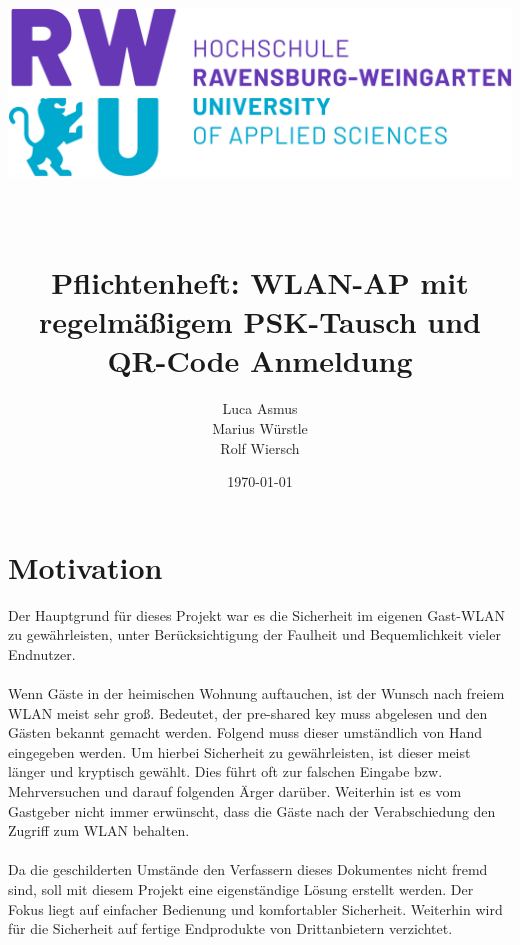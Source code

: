 \documentclass[a4paper,11pt,singlespacing]{article}
\begin{document}
	\setlength{\parindent}{0ex}
	
	\begin{titlepage}
        \author{Luca Asmus\\ Marius Würstle\\Rolf Wiersch}
        \title{\includegraphics[scale=0.3]{rwu_logo_hor-lila-cyan_rgb_0} \\ ~\\ ~\\ Pflichtenheft: WLAN-AP mit regelmäßigem PSK-Tausch und QR-Code Anmeldung \vspace{8cm}}
        \date{\today}
	    \maketitle
	    \thispagestyle{empty}
    \end{titlepage}
	
	\section{Motivation}
	Der Hauptgrund für dieses Projekt war es die Sicherheit im eigenen Gast-WLAN zu gewährleisten, unter Berücksichtigung der Faulheit und Bequemlichkeit vieler Endnutzer. \\ \\
	Wenn Gäste in der heimischen Wohnung auftauchen, ist der Wunsch nach freiem WLAN meist sehr groß. Bedeutet, der pre-shared key muss abgelesen und den Gästen bekannt gemacht werden. Folgend muss dieser umständlich von Hand eingegeben werden. Um hierbei Sicherheit zu gewährleisten, ist dieser meist länger und kryptisch gewählt. Dies führt oft zur falschen Eingabe bzw. Mehrversuchen und darauf folgenden Ärger darüber. Weiterhin ist es vom Gastgeber nicht immer erwünscht, dass die Gäste nach der Verabschiedung den Zugriff zum WLAN behalten. \\ \\
	Da die geschilderten Umstände den Verfassern dieses Dokumentes nicht fremd sind, soll mit diesem Projekt eine eigenständige Lösung erstellt werden. Der Fokus liegt auf einfacher Bedienung und komfortabler Sicherheit. Weiterhin wird für die Sicherheit auf fertige Endprodukte von Drittanbietern verzichtet. 
	
\end{document}

